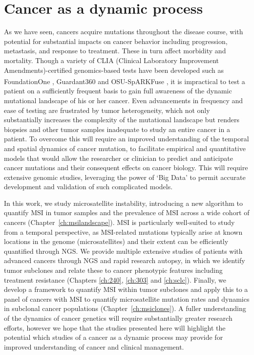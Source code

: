 \section{Cancer as a dynamic process}
As we have seen, cancers acquire mutations throughout the disease course, with potential for substantial impacts on cancer behavior including progression, metastasis, and response to treatment. These in turn affect morbidity and mortality. Though a variety of CLIA (Clinical Laboratory Improvement Amendments)-certified genomics-based tests have been developed such as FoundationOne\textsuperscript\textregistered{} \cite{frampton2013}, Guardant360\textsuperscript\textregistered{} \cite{lanman2015} and OSU-SpARKFuse \cite{reeser2017}, it is impractical to test a patient on a sufficiently frequent basis to gain full awareness of the dynamic mutational landscape of his or her cancer. Even advancements in frequency and ease of testing are frustrated by tumor heterogeneity, which not only substantially increases the complexity of the mutational landscape but renders biopsies and other tumor samples inadequate to study an entire cancer in a patient. To overcome this will require an improved understanding of the temporal and spatial dynamics of cancer mutation, to facilitate empirical and quantitative models that would allow the researcher or clinician to predict and anticipate cancer mutations and their consequent effects on cancer biology. This will require extensive genomic studies, leveraging the power of `Big Data' to permit accurate development and validation of such complicated models.

In this work, we study microsatellite instability, introducing a new algorithm to quantify MSI in tumor samples and the prevalence of MSI across a wide cohort of cancers (Chapter~\ref{ch:msilandscape}). MSI is particularly well-suited to study from a temporal perspective, as MSI-related mutations typically arise at known locations in the genome (microsatellites) and their extent can be efficiently quantified through NGS\@. We provide multiple extensive studies of patients with advanced cancers through NGS and rapid research autopsy, in which we identify tumor subclones and relate these to cancer phenotypic features including treatment resistance (Chapters \ref{ch:240}, \ref{ch:303} and \ref{ch:sclc}). Finally, we develop a framework to quantify MSI within tumor subclones and apply this to a panel of cancers with MSI to quantify microsatellite mutation rates and dynamics in subclonal cancer populations (Chapter~\ref{ch:msiclones}). A fuller understanding of the dynamics of cancer genetics will require substantially greater research efforts, however we hope that the studies presented here will highlight the potential which studies of a cancer as a dynamic process may provide for improved understanding of cancer and clinical management.
